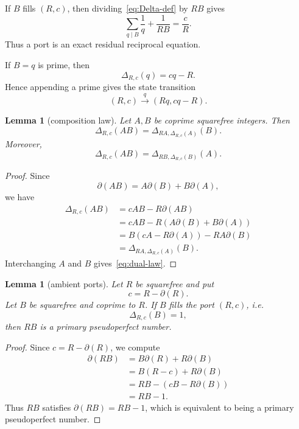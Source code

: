 \documentclass[11pt]{amsart}
\theoremstyle{plain}
\newtheorem{lemma}[theorem]{Lemma}
\theoremstyle{definition}
\theoremstyle{remark}
\newcommand{\D}{\Delta}
\newcommand{\dd}{\partial}
\begin{document}
If $B$ fills $(R,c)$, then dividing~\eqref{eq:Delta-def} by $RB$ gives
\begin{equation}\label{eq:port-reciprocal}
        \sum_{q\mid B}\frac1q+\frac1{RB}=\frac cR.
\end{equation}
Thus a port is an exact residual reciprocal equation.

If $B=q$ is prime, then
\[
        \D_{R,c}(q)=cq-R.
\]
Hence appending a prime gives the state transition
\begin{equation}\label{eq:port-transition}
        (R,c)\xrightarrow{q}(Rq,cq-R).
\end{equation}

\begin{lemma}[composition law]\label{lem:composition}
Let $A,B$ be coprime squarefree integers.  Then
\begin{equation}\label{eq:composition-law}
        \D_{R,c}(AB)=\D_{RA,\D_{R,c}(A)}(B).
\end{equation}
Moreover,
\begin{equation}\label{eq:dual-law}
        \D_{R,c}(AB)=\D_{RB,\D_{R,c}(B)}(A).
\end{equation}
\end{lemma}

\begin{proof}
Since
\[
        \dd(AB)=A\dd(B)+B\dd(A),
\]
we have
\[
\begin{aligned}
        \D_{R,c}(AB)
        &=cAB-R\dd(AB)\\
        &=cAB-R(A\dd(B)+B\dd(A))\\
        &=B(cA-R\dd(A))-RA\dd(B)\\
        &=\D_{RA,\D_{R,c}(A)}(B).
\end{aligned}
\]
Interchanging $A$ and $B$ gives~\eqref{eq:dual-law}.
\end{proof}


\begin{lemma}[ambient ports]\label{lem:ambient-port}
Let $R$ be squarefree and put
\[
        c=R-\dd(R).
\]
Let $B$ be squarefree and coprime to $R$.  If $B$ fills the port $(R,c)$, i.e.
\[
        \D_{R,c}(B)=1,
\]
then $RB$ is a primary pseudoperfect number.
\end{lemma}

\begin{proof}
Since $c=R-\dd(R)$, we compute
\[
\begin{aligned}
        \dd(RB)
        &=B\dd(R)+R\dd(B)\\
        &=B(R-c)+R\dd(B)\\
        &=RB-(cB-R\dd(B))\\
        &=RB-1.
\end{aligned}
\]
Thus $RB$ satisfies $\dd(RB)=RB-1$, which is equivalent to being a primary pseudoperfect number.
\end{proof}
\end{document}
